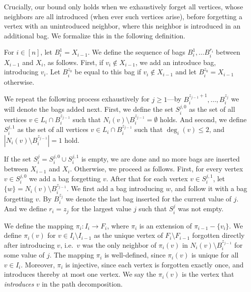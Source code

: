 \documentclass[a4paper,UKenglish,cleveref, autoref, thm-restate]{lipics-v2021}
\begin{document}
Crucially, our bound only holds when we exhaustively forget all vertices, whose neighbors are all introduced (when ever such vertices arise), before forgetting a vertex with an unintroduced neighbor, where this neighbor is introduced in an additional bag. We formalize this in the following definition.

\begin{definition}\label{tripack::def:transition-bags}
    For $i\in [n]$, let $B_i^1 = X_{i-1}$. We define the sequence of bags $B_i^1,\dots B_i^{r_i}$ between $X_{i-1}$ and $X_i$, as follows. 
    First, if $v_i\notin X_{i-1}$, we add an introduce bag, introducing $v_i$. Let $B_i^{z_0}$ be equal to this bag if $v_i \notin X_{i-1}$ and let $B_i^{z_0} = X_{i-1}$ otherwise. 
    
    We repeat the following process exhaustively for $j\geq1$---by $B_i^{z_{j-1}+1}, \dots, B_i^{z_j}$ we will denote the bags added next.
    First, we define the set $S_i^{j,0}$ as the set of all vertices $v\in L_i\cap B_i^{z_{j-1}}$ such that $N_i(v) \setminus B_i^{z_{j-1}}=\emptyset$ holds.
    And second, we define $S_i^{j, 1}$ as the set of all vertices $v\in L_i\cap B_i^{z_{j-1}}$ such that $\deg_i(v)\leq 2$, and $|N_i(v)\setminus B_i^{z_{j-1}}|=1$ hold. 

    If the set $S_i^j = S_i^{j,0} \cup S_i^{j,1}$ is empty, we are done and no more bags are inserted between $X_{i-1}$ and $X_i$.
    Otherwise, we proceed as follows.
    First, for every vertex $v \in S_i^{j,0}$ we add a bag forgetting $v$.
    After that for each vertex $v \in S_i^{j,1}$, let $\{w\} = N_i(v)\setminus B_i^{z_{j-1}}$. 
    We first add a bag introducing $w$, and follow it with a bag forgetting $v$. By $B_i^{z_j}$ we denote the last bag inserted for the current value of $j$. 
    And we define $r_i = z_j$ for the largest value $j$ such that $S_i^j$ was not empty.

    We define the mapping $\pi_i\colon I_i\rightarrow F_i$, where $\pi_i$ is an extension of $\pi_{i-1} - \{v_i\}$. We define $\pi_i(v)$ for $v\in I_i\setminus I_{i-1}$ as the unique vertex of $F_i \setminus F_{i-1}$ forgotten directly after introducing $v$, i.e.\ $v$ was the only neighbor of $\pi_i(v)$ in $N_i(v)\setminus B_i^{z_{j-1}}$ for some value of $j$. The mapping $\pi_i$ is well-defined, since $\pi_i(v)$ is unique for all $v\in I_i$. Moreover, $\pi_i$ is injective, since each vertex is forgotten exactly once, and introduces thereby at most one vertex. We say the $\pi_i(v)$ is the vertex that \emph{introduces} $v$ in the path decomposition.
\end{definition}
\end{document}
